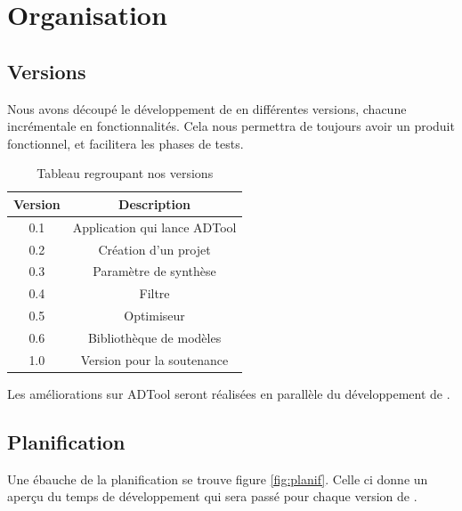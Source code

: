 \section{Organisation}

	\subsection{Versions}
		Nous avons découpé le développement de \glasir en différentes versions, chacune incrémentale en fonctionnalités.
		Cela nous permettra de toujours avoir un produit fonctionnel, et facilitera les phases de tests.

		\begin{table}[h!]
			\begin{center}
			\begin{tabular}{|c|c|}
				\hline
				Version & Description\\
				\hline
				0.1 & Application qui lance ADTool\\
				\hline
				0.2 & Création d'un projet\\
				\hline
				0.3 & Paramètre de synthèse\\
				\hline
				0.4 & Filtre\\
				\hline
				0.5 & Optimiseur\\
				\hline
				0.6 & Bibliothèque de modèles\\
				\hline
				1.0 & Version pour la soutenance\\
				\hline
			\end{tabular}
			\end{center}
			\caption{Tableau regroupant nos versions}
		\end{table} %

		Les améliorations sur ADTool seront réalisées en parallèle du développement de \glasir.

	\subsection{Planification}
		Une ébauche de la planification se trouve figure \ref{fig:planif}. Celle ci donne un aperçu du temps de développement qui sera passé pour chaque version de \glasir. 

